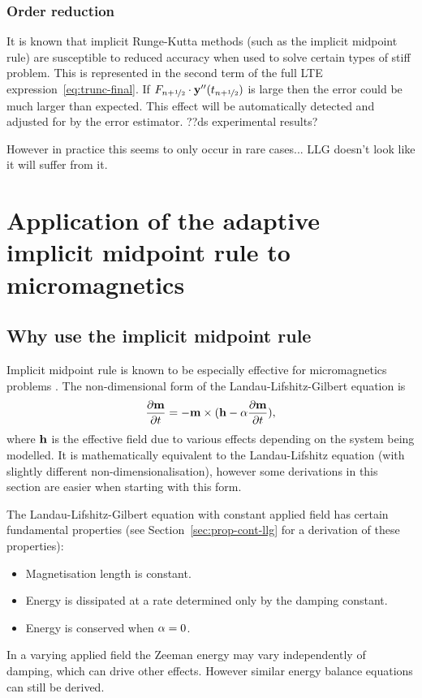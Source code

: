 \subsubsection{Order reduction}

It is known that implicit Runge-Kutta methods (such as the implicit midpoint rule) are susceptible to reduced accuracy when used to solve certain types of stiff problem.
This is represented in the second term of the full LTE expression~\eqref{eq:trunc-final}.
If $\dfdyhf \cdot \yvhf['']$ is large then the error could be much larger than expected.
This effect will be automatically detected and adjusted for by the error estimator. ??ds experimental results?

However in practice this seems to only occur in rare cases...
LLG doesn't look like it will suffer from it.



\section{Application of the adaptive implicit midpoint rule to micromagnetics}


\subsection{Why use the implicit midpoint rule}

Implicit midpoint rule is known to be especially effective for micromagnetics problems \cite{DAquino2005}.
The non-dimensional form of the Landau-Lifshitz-Gilbert equation is
\begin{equation}
  \label{eq:llg-prop-form}
  \dmdt = - \mv \times( \hv - \dampc \dmdt),
\end{equation}
where $\hv$ is the effective field due to various effects depending on the system being modelled.
It is mathematically equivalent to the Landau-Lifshitz equation (with slightly different non-dimensionalisation), however some derivations in this section are easier when starting with this form.

The Landau-Lifshitz-Gilbert equation with constant applied field has certain fundamental properties (see Section~\ref{sec:prop-cont-llg} for a derivation of these properties):
\begin{itemize}
\item Magnetisation length is constant.
\item Energy is dissipated at a rate determined only by the damping constant.
\item Energy is conserved when $\dampc = 0$.
\end{itemize}
In a varying applied field the Zeeman energy may vary independently of damping, which can drive other effects.
However similar energy balance equations can still be derived.

